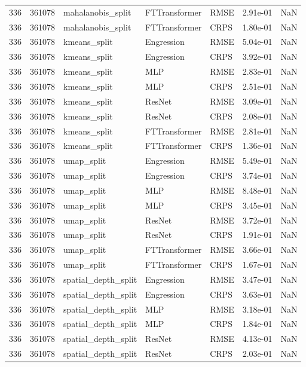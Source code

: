 \begin{tabular}{rrlllrr}
336 & 361078 & mahalanobis\_split & FTTransformer & RMSE & 2.91e-01 & NaN \\
336 & 361078 & mahalanobis\_split & FTTransformer & CRPS & 1.80e-01 & NaN \\
336 & 361078 & kmeans\_split & Engression & RMSE & 5.04e-01 & NaN \\
336 & 361078 & kmeans\_split & Engression & CRPS & 3.92e-01 & NaN \\
336 & 361078 & kmeans\_split & MLP & RMSE & 2.83e-01 & NaN \\
336 & 361078 & kmeans\_split & MLP & CRPS & 2.51e-01 & NaN \\
336 & 361078 & kmeans\_split & ResNet & RMSE & 3.09e-01 & NaN \\
336 & 361078 & kmeans\_split & ResNet & CRPS & 2.08e-01 & NaN \\
336 & 361078 & kmeans\_split & FTTransformer & RMSE & 2.81e-01 & NaN \\
336 & 361078 & kmeans\_split & FTTransformer & CRPS & 1.36e-01 & NaN \\
336 & 361078 & umap\_split & Engression & RMSE & 5.49e-01 & NaN \\
336 & 361078 & umap\_split & Engression & CRPS & 3.74e-01 & NaN \\
336 & 361078 & umap\_split & MLP & RMSE & 8.48e-01 & NaN \\
336 & 361078 & umap\_split & MLP & CRPS & 3.45e-01 & NaN \\
336 & 361078 & umap\_split & ResNet & RMSE & 3.72e-01 & NaN \\
336 & 361078 & umap\_split & ResNet & CRPS & 1.91e-01 & NaN \\
336 & 361078 & umap\_split & FTTransformer & RMSE & 3.66e-01 & NaN \\
336 & 361078 & umap\_split & FTTransformer & CRPS & 1.67e-01 & NaN \\
336 & 361078 & spatial\_depth\_split & Engression & RMSE & 3.47e-01 & NaN \\
336 & 361078 & spatial\_depth\_split & Engression & CRPS & 3.63e-01 & NaN \\
336 & 361078 & spatial\_depth\_split & MLP & RMSE & 3.18e-01 & NaN \\
336 & 361078 & spatial\_depth\_split & MLP & CRPS & 1.84e-01 & NaN \\
336 & 361078 & spatial\_depth\_split & ResNet & RMSE & 4.13e-01 & NaN \\
336 & 361078 & spatial\_depth\_split & ResNet & CRPS & 2.03e-01 & NaN \\

\end{tabular}
